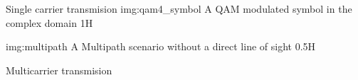 \begin{subchapter}{Single carrier transmision}
               {img:qam4_symbol}
               {A QAM modulated symbol in the complex domain}
               {1}{H}

               {img:multipath}
               {A Multipath scenario without a direct line of sight}
               {0.5}{H}

\end{subchapter}

\begin{subchapter}{Multicarrier transmision}

\end{subchapter}
